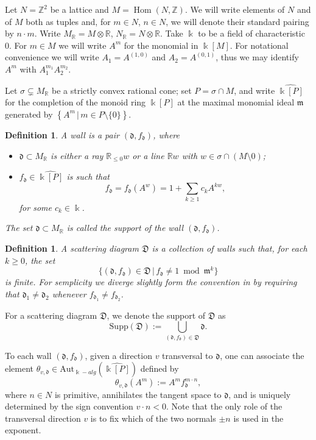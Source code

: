 \documentclass[11pt]{amsart}
\newtheorem{defn}[theorem]{Definition}
\theoremstyle{remark}
\numberwithin{equation}{section}
\newcommand{\RR}{\mathbb{R}}
\newcommand{\ZZ}{\mathbb{Z}}
\newcommand{\fd}{\mathfrak{d}}
\newcommand{\fD}{\mathfrak{D}}
\newcommand{\fm}{\mathfrak{m}}
\newcommand{\Hom}{\operatorname{Hom}}
\begin{document}
Let $N = \ZZ^2$ be a lattice and $M = \Hom (N, \ZZ)$. We will write elements of
$N$ and of $M$ both as tuples and, for $m\in N$, $n\in N$, we will denote their 
standard pairing by $n \cdot m$. Write
$M_{\RR} = M\otimes\RR$, $N_{\RR} = N\otimes\RR$. Take $\Bbbk$ to be a field of
characteristic 0.  For $m\in M$ we will write $A^m$ for the monomial in
$\Bbbk[M]$.  For notational convenience we will write $A_1=A^{(1,0)}$ and
$A_2=A^{(0,1)}$, thus we may identify $A^m$ with $A_1^{m_1}A_2^{m_2}$.

Let $\sigma \subsetneq M_{\RR}$ be a strictly convex rational cone; set
$P=\sigma \cap M$, and write $\widehat{\Bbbk[P]}$ for the completion of the
monoid ring $\Bbbk[P]$ at the maximal monomial ideal $\fm$ generated by
$\left\{A^m \,|\, m\in P\setminus\{0\}\right\}$.

\begin{defn}
  \label{walldef}
  A \emph{wall} is a pair $(\fd, f_{\fd})$, where 
  \begin{itemize}

    \item 
      $\fd \subset M_{\mathbb{R}}$ is either a ray $\RR_{\le 0} w$ or a line
      $\RR w$ with $w\in \sigma \cap(M\setminus 0)$;

    \item 
      $f_{\fd} \in \widehat{\Bbbk [P]}$ is such that 
      \[ 
        f_{\fd} = f_{\fd}(A^w) = 1 + \sum_{k\geq 1} c_k A^{k w},
      \] 
      for some $c_k \in \Bbbk$. 
  \end{itemize}
  The set $\fd \subset M_{\mathbb{R}}$ is called the \emph{support} of the wall
  $(\fd, f_{\fd})$.
\end{defn}

\begin{defn}
  \label{def:scattering_diagram}
  A scattering diagram $\fD$ is a collection of walls such that, for each $k \geq
  0$, the set
  \[
    \{ (\fd, f_{\fd}) \in \fD\, |\, f_{\fd} \neq 1 \bmod \fm^k \}
  \]
  is finite. For semplicity we diverge slightly form the convention in
  \cite{GHKK} by requiring that $\fd_1 \neq \fd_2$ whenever $f_{\fd_1}\neq
  f_{\fd_2}$.
\end{defn}

For a scattering diagram $\fD$, we denote the support of $\fD$ as
\[
  \text{Supp} (\fD) := \bigcup_{(\fd, f_{\fd}) \in \fD} \fd. 
\]

To each wall $(\fd, f_{\fd})$, given a direction $v$ transversal to $\fd$, one
can associate the element $\theta_{v,\fd}\in
{\mathrm{Aut}}_{\Bbbk-alg}\left(\widehat{\Bbbk[P]}\right)$ defined by
\[
  \theta_{v,\fd} (A^m) := A^m f_{\fd}^{m\cdot n }, 
\]
where $n\in N$ is primitive, annihilates the tangent space to $\fd$, and is
uniquely determined by the sign convention $ v\cdot n <0$.  Note
that the only role of the transversal direction $v$ is to fix which of the two
normals $\pm n$ is used in the exponent. 
\end{document}
